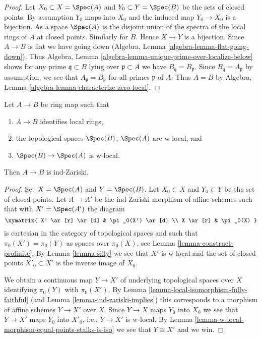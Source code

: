 \begin{proof}
Let $X_0 \subset X = \Spec(A)$ and $Y_0 \subset Y = \Spec(B)$ be the
sets of closed points. By assumption $Y_0$ maps into $X_0$ and
the induced map $Y_0 \to X_0$ is a bijection.
As a space $\Spec(A)$ is the disjoint union of the spectra
of the local rings of $A$ at closed points.
Similarly for $B$. Hence $X \to Y$ is a bijection.
Since $A \to B$ is flat we have going down
(Algebra, Lemma \ref{algebra-lemma-flat-going-down}).
Thus Algebra, Lemma \ref{algebra-lemma-unique-prime-over-localize-below}
shows for any prime $\mathfrak q \subset B$ lying over
$\mathfrak p \subset A$ we have $B_\mathfrak q = B_\mathfrak p$.
Since $B_\mathfrak q = A_\mathfrak p$ by assumption, we
see that $A_\mathfrak p = B_\mathfrak p$ for all primes $\mathfrak p$
of $A$. Thus $A = B$ by
Algebra, Lemma \ref{algebra-lemma-characterize-zero-local}.
\end{proof}

\begin{lemma}
\label{lemma-w-local-morphism-equal-stalks-is-ind-zariski}
Let $A \to B$ be ring map such that
\begin{enumerate}
\item $A \to B$ identifies local rings,
\item the topological spaces $\Spec(B)$, $\Spec(A)$ are w-local, and
\item $\Spec(B) \to \Spec(A)$ is w-local.
\end{enumerate}
Then $A \to B$ is ind-Zariski.
\end{lemma}

\begin{proof}
Set $X = \Spec(A)$ and $Y = \Spec(B)$. Let $X_0 \subset X$ and
$Y_0 \subset Y$ be the set of closed points. Let $A \to A'$ be the ind-Zariski
morphism of affine schemes such that with $X' = \Spec(A')$ the diagram
$$
\xymatrix{
X' \ar[r] \ar[d] & \pi_0(X') \ar[d] \\
X \ar[r] & \pi_0(X)
}
$$
is cartesian in the category of topological spaces and such that
$\pi_0(X') = \pi_0(Y)$ as spaces over $\pi_0(X)$, see
Lemma \ref{lemma-construct-profinite}. By
Lemma \ref{lemma-silly} we see that $X'$ is w-local and
the set of closed points $X'_0 \subset X'$ is the inverse image of $X_0$.

\medskip\noindent
We obtain a continuous map $Y \to X'$ of underlying topological spaces
over $X$ identifying $\pi_0(Y)$ with $\pi_0(X')$. By
Lemma \ref{lemma-local-isomorphism-fully-faithful}
(and Lemma \ref{lemma-ind-zariski-implies})
this corresponds to a morphism of affine schemes $Y \to X'$
over $X$. Since $Y \to X$ maps $Y_0$ into $X_0$ we see that
$Y \to X'$ maps $Y_0$ into $X'_0$, i.e., $Y \to X'$ is w-local.
By Lemma \ref{lemma-w-local-morphism-equal-points-stalks-is-iso}
we see that $Y \cong X'$ and we win.
\end{proof}

